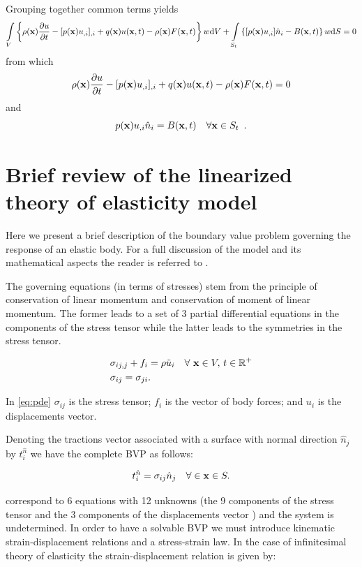Grouping together common terms yields
\[\int\limits_V \left\{\rho(\vb x)\pdv{u}{t} - [p(\vb x)u_{,i}]_{,i} + q(\vb x)u(\vb x, t) - \rho(\vb x)F(\vb x, t)\right\} w\dd V + \int \limits_{S_t} \left\{[p(\vb x)u_{,i}]\hat n_i - B(\vb x, t) \right\} w\dd S = 0\]
from which
\[\rho(\vb x)\pdv{u}{t} - [p(\vb x)u_{,i}]_{,i} + q(\vb x)u(\vb x, t) - \rho(\vb x)F(\vb x, t) = 0\]
and
\[p(\vb x)u_{,i}\hat n_i = B(\vb x, t)  \quad\forall \vb x \in S_t \enspace .\]


\section{Brief review of the linearized theory of elasticity model}
Here we present a brief description of the boundary value problem governing the response of an elastic body. For a full discussion of the model and its mathematical aspects the reader is referred to \cite{shames1997elastic}.

The governing equations (in terms of stresses) stem from the principle of conservation of linear momentum and conservation of moment of linear momentum. The former leads to a set of 3 partial differential equations in the components of the stress tensor while the latter leads to the symmetries in the stress tensor.

\begin{equation} \label{eq:pde}
\begin{aligned}
&\sigma_{ij,j} + {f_i} = \rho\ddot{u}_i \quad \forall\ \vb{x} \in V,\, t \in \mathbb{R}^{+}\\
&\sigma_{ij}=\sigma _{ji}.
\end{aligned} 
\end{equation}

In \cref{eq:pde} $\sigma_{ij}$ is the stress tensor; $f_i$ is the vector of body forces; and $u_i$ is the displacements vector.

Denoting the tractions vector associated with a surface with normal direction $\hat{n}_{j}$ by $t_i^{\hat n}$ we have the complete BVP as follows:

\begin{equation} \label{eq:bcs}
t_i^{\hat n} = \sigma_{ij} \hat{n}_{j} \quad \forall \in \vb{x} \in S.
\end{equation}

 correspond to 6 equations with 12 unknowns (the 9 components of the stress tensor and the 3 components of the displacements vector ) and the system is undetermined. In order to have a solvable BVP we must introduce kinematic strain-displacement relations and a stress-strain law. In the case of infinitesimal theory of elasticity the strain-displacement relation is given by:

